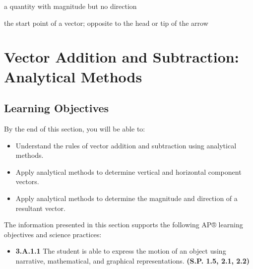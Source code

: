 \documentclass[
]{book}
\providecommand{\tightlist}{%
  \setlength{\itemsep}{0pt}\setlength{\parskip}{0pt}}
\newenvironment{learning-objectives}{}{}
\begin{document}
\begin{description}
\tightlist
\item[scalar]
a quantity with magnitude but no direction
\end{description}

\begin{description}
\tightlist
\item[tail]
the start point of a vector; opposite to the head or tip of the
arrow
\end{description}

\hypertarget{vector-addition-and-subtraction-analytical-methods}{%
\section{Vector Addition and Subtraction: Analytical Methods}\label{vector-addition-and-subtraction-analytical-methods}}

\hypertarget{fs-id1468448}{}
\begin{learning-objectives}

\hypertarget{learning-objectives-10}{%
\subsection{Learning Objectives}\label{learning-objectives-10}}

By the end of this section, you will be able to:

\begin{itemize}
\tightlist
\item
  Understand the rules of vector addition and subtraction using
  analytical methods.
\item
  Apply analytical methods to determine vertical and horizontal
  component vectors.
\item
  Apply analytical methods to determine the magnitude and direction of
  a resultant vector.
\end{itemize}

The information presented in this section supports the following AP®
learning objectives and science practices:

\begin{itemize}
\tightlist
\item
  \textbf{3.A.1.1} The student is able to express the motion of an object
  using narrative, mathematical, and graphical representations.
  \textbf{(S.P. 1.5, 2.1, 2.2)}
\end{itemize}

\end{learning-objectives}
\end{document}
